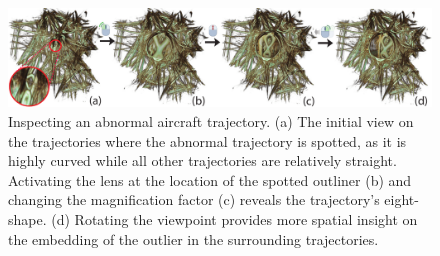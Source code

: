  


\begin{figure}[htbp]
\includegraphics [width=\textwidth]{images/aircraft_lens.pdf}
\caption{Inspecting an abnormal aircraft trajectory. (a) The initial view on the trajectories where the abnormal trajectory is spotted, as it is highly curved while all other trajectories are relatively straight. Activating the lens at the location of the spotted outliner (b) and changing the magnification factor (c) reveals the trajectory's eight-shape. (d) Rotating the viewpoint provides more spatial insight on the embedding of the outlier in the surrounding trajectories.}
\label{f:aircraft_lens}
\end{figure}
%

